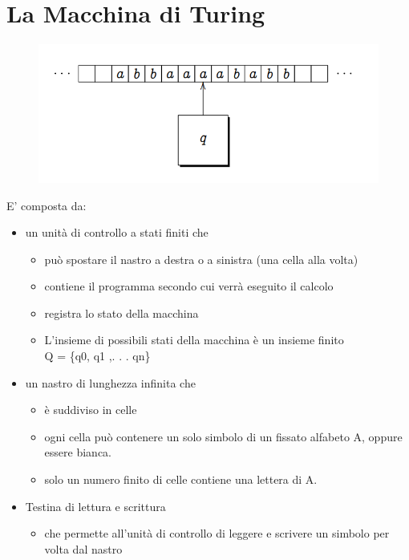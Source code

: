 \chapter{La Macchina di Turing} \label{ch:capitolo3}
\begin{figure}[htp]
    \centering
     \includegraphics[scale=0.7]{tesi_stile/img/turing.png}
\end{figure}
E' composta da: 
\begin{itemize}
    \item un unità di controllo a stati finiti che
    \begin{itemize}
    
        \item può spostare il nastro a destra o a sinistra (una cella alla volta)
        
        \item contiene il programma secondo cui verrà eseguito il calcolo
        
        \item registra lo stato della macchina
        
        \item L’insieme di possibili stati della macchina è un insieme finito\\Q = \{q0, q1 ,. . . qn\}
    \end{itemize}
    \newpage
    \item un nastro di lunghezza infinita che
    
    \begin{itemize}
        \item è suddiviso in celle
        
        \item ogni cella può contenere un solo simbolo di un fissato alfabeto A, oppure essere bianca.
        
        \item  solo un numero finito di celle contiene una lettera di A.
    \end{itemize}
    
    \item Testina di lettura e scrittura
    
    \begin{itemize}
        \item che permette all’unità di controllo di leggere e scrivere un simbolo per volta dal nastro
    \end{itemize}
    
\end{itemize}
